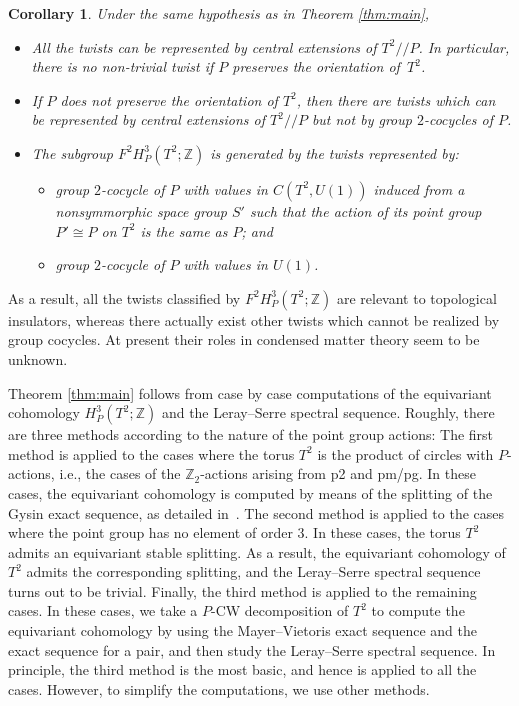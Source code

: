 \documentclass[pdftex]{sigma}
\newtheorem{cor}[thm]{Corollary}
\theoremstyle{definition}
\newcommand{\Z}{\mathbb{Z}}
\begin{document}
\begin{cor} \label{cor:main}
Under the same hypothesis as in Theorem {\rm \ref{thm:main}},
\begin{itemize}\itemsep=0pt
\item[$(a)$] All the twists can be represented by central extensions of $T^2/\!/P$. In particular, there is no non-trivial twist if $P$ preserves the orientation of~$T^2$.

\item[$(b)$] If $P$ does not preserve the orientation of $T^2$, then there are twists which can be represented by central extensions of $T^2/\!/P$ but not by group $2$-cocycles of $P$.

\item[$(c)$] The subgroup $F^2H^3_P(T^2; \Z)$ is generated by the twists represented by:
\begin{itemize}\itemsep=0pt
\item group $2$-cocycle of $P$ with values in $C(T^2, U(1))$ induced from a nonsymmorphic space group $S'$ such that the action of its point group $P' \cong P$ on $T^2$ is the same as $P$; and

\item group $2$-cocycle of $P$ with values in $U(1)$.
\end{itemize}
\end{itemize}
\end{cor}

As a result, all the twists classif\/ied by $F^2H^3_P(T^2; \Z)$ are relevant to topological insulators, whereas there actually exist other twists which cannot be realized by group cocycles. At present their roles in condensed matter theory seem to be unknown.

Theorem \ref{thm:main} follows from case by case computations of the equivariant cohomology $H^3_P(T^2; \Z)$ and the Leray--Serre spectral sequence. Roughly, there are three methods according to the nature of the point group actions: The f\/irst method is applied to the cases where the torus $T^2$ is the product of circles with $P$-actions, i.e., the cases of the $\Z_2$-actions arising from \textsf{p2} and \textsf{pm/pg}. In these cases, the equivariant cohomology is computed by means of the splitting of the Gysin exact sequence, as detailed in~\cite{G}. The second method is applied to the cases where the point group has no element of order $3$. In these cases, the torus $T^2$ admits an equivariant stable splitting. As a result, the equivariant cohomology of $T^2$ admits the corresponding splitting, and the Leray--Serre spectral sequence turns out to be trivial. Finally, the third method is applied to the remaining cases. In these cases, we take a $P$-CW decomposition of $T^2$ to compute the equivariant cohomology by using the Mayer--Vietoris exact sequence and the exact sequence for a pair, and then study the Leray--Serre spectral sequence. In principle, the third method is the most basic, and hence is applied to all the cases. However, to simplify the computations, we use other methods.
\end{document}
